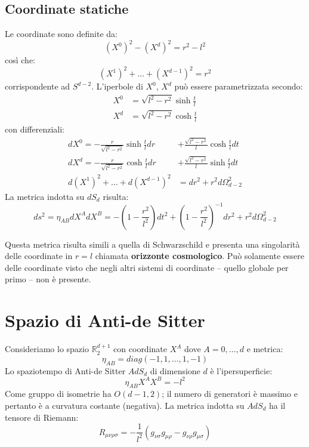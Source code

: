 \subsection{Coordinate statiche}
Le coordinate sono definite da:
\begin{equation*}
    (X^0)^2 - (X^d)^2 = r^2 - l^2
\end{equation*}
così che:
\begin{equation*}
    (X^1)^2 + \dots + (X^{d-1})^2 = r^2
\end{equation*}
corrispondente ad $S^{d-2}$. L'iperbole di $X^0$, $X^d$ può essere parametrizzata secondo:
\begin{align*}
    X^0 &= \sqrt{l^2 - r^2}\sinh \frac{t}{l} \\
    X^d &= \sqrt{l^2 - r^2}\cosh \frac{t}{l}
\end{align*}
con differenziali:
\begin{align*}
    dX^0 = -\frac{r}{\sqrt{l^2-r^2}}\sinh\frac{t}{l}dr &+ \frac{\sqrt{l^2-r^2}}{l}\cosh\frac{t}{l}dt \\
    dX^d = -\frac{r}{\sqrt{l^2-r^2}}\cosh\frac{t}{l}dr &+ \frac{\sqrt{l^2-r^2}}{l}\sinh\frac{t}{l}dt \\
    d(X^1)^2 + \dots + d(X^{d-1})^2 &= dr^2 + r^2 d\Omega_{d-2}^2
\end{align*}
La metrica indotta su $dS_d$ risulta:
\begin{equation}
    ds^2 = \eta_{AB}dX^A dX^B = - \left( 1 - \frac{r^2}{l^2} \right)dt^2 + \left(1 - \frac{r^2}{l^2}\right)^{-1}dr^2 + r^2 d\Omega_{d-2}^2
    \label{eq.metrica_desitter_statica}
\end{equation}

Questa metrica risulta simili a quella di Schwarzschild e presenta una singolarità delle coordinate in $r=l$ chiamata \textbf{orizzonte cosmologico}. Può solamente essere delle coordinate visto che negli altri sistemi di coordinate -- quello globale per primo -- non è presente.
\section{Spazio di Anti-de Sitter}
Consideriamo lo spazio $\mathbb{R}^{d+1}_2$ con coordinate $X^A$ dove $A = 0,\dots, d$ e metrica:
\begin{equation*}
    \eta_{AB} = diag(-1,1,\dots,1,-1)
\end{equation*}
Lo spaziotempo di Anti-de Sitter $AdS_d$ di dimensione $d$ è l'ipersuperficie:
\begin{equation*}
    \eta_{AB}X^A X^B = - l^2
\end{equation*}
Come gruppo di isometrie ha $O(d-1,2)$; il numero di generatori è massimo e pertanto è a curvatura costante (negativa).  La metrica indotta su $AdS_d$ ha il tensore di Riemann:
\begin{equation*}
    R_{\mu\nu\rho\sigma} = -\frac{1}{l^2}(g_{\nu\sigma}g_{\mu\rho} - g_{\nu\rho}g_{\mu\sigma})
\end{equation*}


